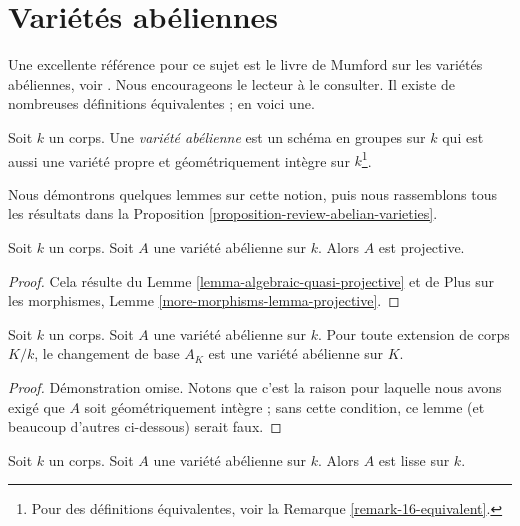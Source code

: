 \section{Variétés abéliennes}
\label{section-abelian-varieties}

\noindent
Une excellente référence pour ce sujet est le livre de Mumford sur les
variétés abéliennes, voir \cite{AVar}. Nous encourageons le lecteur à
le consulter. Il existe de nombreuses définitions équivalentes ; en voici une.

\begin{definition}
\label{definition-abelian-variety}
Soit $k$ un corps. Une {\it variété abélienne} est un schéma en groupes sur
$k$ qui est aussi une variété propre et géométriquement intègre sur
$k$\footnote{Pour des définitions équivalentes, voir la Remarque \ref{remark-16-equivalent}.}.
\end{definition}

\noindent
Nous démontrons quelques lemmes sur cette notion, puis nous rassemblons
tous les résultats dans la
Proposition \ref{proposition-review-abelian-varieties}.

\begin{lemma}
\label{lemma-abelian-variety-projective}
Soit $k$ un corps. Soit $A$ une variété abélienne sur $k$.
Alors $A$ est projective.
\end{lemma}

\begin{proof}
Cela résulte du
Lemme \ref{lemma-algebraic-quasi-projective} et de
Plus sur les morphismes, Lemme \ref{more-morphisms-lemma-projective}.
\end{proof}

\begin{lemma}
\label{lemma-abelian-variety-change-field}
Soit $k$ un corps. Soit $A$ une variété abélienne sur $k$.
Pour toute extension de corps $K/k$, le changement de base $A_K$ est une
variété abélienne sur $K$.
\end{lemma}

\begin{proof}
Démonstration omise. Notons que c'est la raison pour laquelle nous avons exigé que $A$ soit
géométriquement intègre ; sans cette condition, ce lemme
(et beaucoup d'autres ci-dessous) serait faux.
\end{proof}

\begin{lemma}
\label{lemma-abelian-variety-smooth}
Soit $k$ un corps. Soit $A$ une variété abélienne sur $k$.
Alors $A$ est lisse sur $k$.
\end{lemma}

